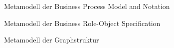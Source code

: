 \begin{frame}{Metamodell der Business Process Model and Notation}
  
\end{frame}

\begin{frame}{Metamodell der Business Role-Object Specification}
  
\end{frame}

\begin{frame}{Metamodell der Graphstruktur}
  
\end{frame}